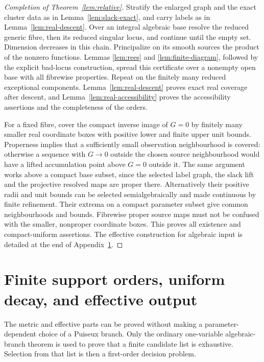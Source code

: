 \begin{proof}[Completion of Theorem~\ref{lem:relative}]
Stratify the enlarged graph and the exact cluster data as in
Lemma~\ref{lem:slack-exact}, and carry labels as in
Lemma~\ref{lem:real-descent}. Over an integral algebraic base resolve the
reduced generic fibre, then its reduced singular locus, and continue until
the empty set. Dimension decreases in this chain. Principalize on its
smooth sources the product of the nonzero functions. Lemmas
\ref{lem:rees} and \ref{lem:finite-diagram}, followed by the explicit
bad-locus construction, spread this certificate over a nonempty open
base with all fibrewise properties. Repeat on the finitely many reduced
exceptional components. Lemma~\ref{lem:real-descent} proves exact real
coverage after descent, and Lemma~\ref{lem:real-accessibility} proves
the accessibility assertions and the completeness of the orders.

For a fixed fibre, cover the compact inverse image of $G=0$ by finitely
many smaller real coordinate boxes with positive lower and finite upper
unit bounds. Properness implies that a sufficiently small observation
neighbourhood is covered: otherwise a sequence with $G\to0$ outside
the chosen source neighbourhood would have a lifted accumulation point
above $G=0$ outside it. The same argument works above a compact base
subset, since the selected label graph, the slack lift and the projective
resolved maps are proper there. Alternatively their positive radii and
unit bounds can be selected semialgebraically and made continuous by
finite refinement. Their extrema on a compact parameter subset give
common neighbourhoods and bounds. Fibrewise proper source maps must not
be confused with the smaller, nonproper coordinate boxes. This proves
all existence and compact-uniform assertions. The effective construction
for algebraic input is detailed at the end of Appendix~\ref{app:effective}.
\end{proof}

\section{Finite support orders, uniform decay, and effective output}\label{app:effective}
The metric and effective parts can be proved without making a
parameter-dependent choice of a Puiseux branch. Only the ordinary
one-variable algebraic-branch theorem is used to prove that a finite
candidate list is exhaustive. Selection from that list is then a
first-order decision problem.

